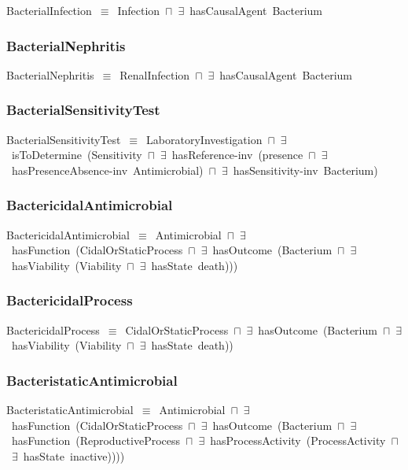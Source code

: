 \documentclass{article}
\begin{document}
BacterialInfection~\ensuremath{\equiv}~Infection~\ensuremath{\sqcap}~\ensuremath{\exists}~hasCausalAgent~Bacterium

\subsubsection*{BacterialNephritis}

BacterialNephritis~\ensuremath{\equiv}~RenalInfection~\ensuremath{\sqcap}~\ensuremath{\exists}~hasCausalAgent~Bacterium

\subsubsection*{BacterialSensitivityTest}

BacterialSensitivityTest~\ensuremath{\equiv}~LaboratoryInvestigation~\ensuremath{\sqcap}~\ensuremath{\exists}~isToDetermine~(Sensitivity~\ensuremath{\sqcap}~\ensuremath{\exists}~hasReference-inv~(presence~\ensuremath{\sqcap}~\ensuremath{\exists}~hasPresenceAbsence-inv~Antimicrobial)~\ensuremath{\sqcap}~\ensuremath{\exists}~hasSensitivity-inv~Bacterium)

\subsubsection*{BactericidalAntimicrobial}

BactericidalAntimicrobial~\ensuremath{\equiv}~Antimicrobial~\ensuremath{\sqcap}~\ensuremath{\exists}~hasFunction~(CidalOrStaticProcess~\ensuremath{\sqcap}~\ensuremath{\exists}~hasOutcome~(Bacterium~\ensuremath{\sqcap}~\ensuremath{\exists}~hasViability~(Viability~\ensuremath{\sqcap}~\ensuremath{\exists}~hasState~death)))

\subsubsection*{BactericidalProcess}

BactericidalProcess~\ensuremath{\equiv}~CidalOrStaticProcess~\ensuremath{\sqcap}~\ensuremath{\exists}~hasOutcome~(Bacterium~\ensuremath{\sqcap}~\ensuremath{\exists}~hasViability~(Viability~\ensuremath{\sqcap}~\ensuremath{\exists}~hasState~death))

\subsubsection*{BacteristaticAntimicrobial}

BacteristaticAntimicrobial~\ensuremath{\equiv}~Antimicrobial~\ensuremath{\sqcap}~\ensuremath{\exists}~hasFunction~(CidalOrStaticProcess~\ensuremath{\sqcap}~\ensuremath{\exists}~hasOutcome~(Bacterium~\ensuremath{\sqcap}~\ensuremath{\exists}~hasFunction~(ReproductiveProcess~\ensuremath{\sqcap}~\ensuremath{\exists}~hasProcessActivity~(ProcessActivity~\ensuremath{\sqcap}~\ensuremath{\exists}~hasState~inactive))))
\end{document}
